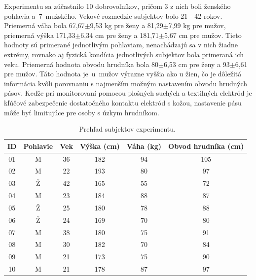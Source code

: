 Experimentu sa zúčastnilo 10 dobrovoľníkov, pričom 3 z nich boli ženského pohlavia a~7~mužského. Vekové rozmedzie subjektov bolo 21 - 42 rokov. Priemerná váha bola 67,67\( \pm \)9,53 kg pre ženy a 81,29\( \pm \)7,99 kg pre mužov, priemerná výška 171,33\( \pm \)6,34 cm pre ženy a 181,71\( \pm \)5,67 cm pre mužov. Tieto hodnoty sú primerané jednotlivým pohlaviam, nenachádzajú sa v nich žiadne extrémy, rovnako aj fyzická kondícia jednotlivých subjektov bola primeraná ich veku. Priemerná hodnota obvodu hrudníka bola 80\( \pm \)6,53 cm pre ženy a 93\( \pm \)6,61 pre mužov. Táto hodnota je~u~mužov výrazne vyššia ako u žien, čo je dôležitá informácia kvôli porovnaniu s najmenším možným nastavením obvodu hrudných pásov. Keďže pri monitorovaní pomocou plošných suchých a textilných elektród je kľúčové zabezpečenie dostatočného kontaktu elektród s kožou, nastavenie pásu môže byť limitujúce pre osoby s úzkym hrudníkom.

\begin{table}[H]\centering
\caption[Prehľad subjektov experimentu.]{~Prehľad subjektov experimentu.}\label{tab:subjects}
    \begin{tabular}{c|c|c|c|c|c}
    	\textbf{ID} & \textbf{Pohlavie} & \textbf{Vek} & \textbf{Výška (cm)} & \textbf{Váha (kg)} & \textbf{Obvod hrudníka (cm)} \tabularnewline \hline 
     	01        	          &  M                & 36           & 182                 & 94                 & 105                          \tabularnewline \hline
        02        	          &  M                & 22           & 193                 & 80                 & 97                           \tabularnewline \hline
        03        	          &  Ž                & 42           & 165                 & 55                 & 72                           \tabularnewline \hline
        04        	          &  M                & 23           & 184                 & 88                 & 87                           \tabularnewline \hline
        05        	          &  Ž                & 25           & 180                 & 78                 & 88                           \tabularnewline \hline
        06        	          &  Ž                & 24           & 169                 & 70                 & 80                           \tabularnewline \hline
        07        	          &  M                & 38           & 180                 & 75                 & 91                           \tabularnewline \hline
        08        	          &  M                & 30           & 182                 & 70                 & 84                           \tabularnewline \hline
        09        	          &  M                & 21           & 173                 & 75                 & 90                           \tabularnewline \hline
        10        	          &  M                & 21           & 178                 & 87                 & 97                           \tabularnewline
    \end{tabular}
\end{table}


